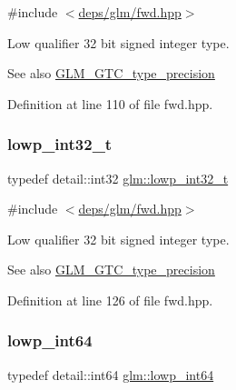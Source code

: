 {\ttfamily \#include $<$\hyperlink{fwd_8hpp}{deps/glm/fwd.\+hpp}$>$}

Low qualifier 32 bit signed integer type. \begin{DoxySeeAlso}{See also}
\hyperlink{group__gtc__type__precision}{G\+L\+M\+\_\+\+G\+T\+C\+\_\+type\+\_\+precision} 
\end{DoxySeeAlso}


Definition at line 110 of file fwd.\+hpp.

\mbox{\label{group__gtc__type__precision_gad9567c806dc39f534174eef42663119d}} 
\subsubsection{\texorpdfstring{lowp\+\_\+int32\+\_\+t}{lowp\_int32\_t}}
{\footnotesize\ttfamily typedef detail\+::int32 \hyperlink{group__gtc__type__precision_gad9567c806dc39f534174eef42663119d}{glm\+::lowp\+\_\+int32\+\_\+t}}



{\ttfamily \#include $<$\hyperlink{fwd_8hpp}{deps/glm/fwd.\+hpp}$>$}

Low qualifier 32 bit signed integer type. \begin{DoxySeeAlso}{See also}
\hyperlink{group__gtc__type__precision}{G\+L\+M\+\_\+\+G\+T\+C\+\_\+type\+\_\+precision} 
\end{DoxySeeAlso}


Definition at line 126 of file fwd.\+hpp.

\mbox{\label{group__gtc__type__precision_gab8a8e75af347592406e41b3ae2c0712b}} 
\subsubsection{\texorpdfstring{lowp\+\_\+int64}{lowp\_int64}}
{\footnotesize\ttfamily typedef detail\+::int64 \hyperlink{group__gtc__type__precision_gab8a8e75af347592406e41b3ae2c0712b}{glm\+::lowp\+\_\+int64}}



